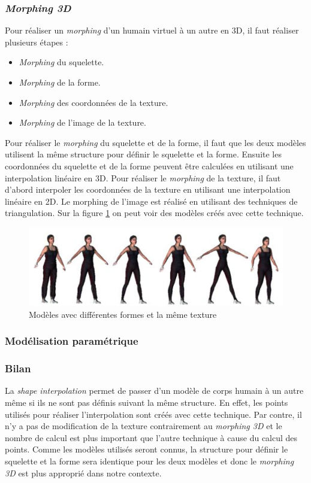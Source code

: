 \subsubsection{\emph{Morphing 3D}}
Pour réaliser un \emph{morphing} d'un humain virtuel à un autre en 3D, il faut réaliser plusieurs étapes \cite{le01} :
\begin{itemize}
\item \emph{Morphing} du squelette.
\item \emph{Morphing} de la forme.
\item \emph{Morphing} des coordonnées de la texture.
\item \emph{Morphing} de l'image de la texture.
\end{itemize}
Pour réaliser le \emph{morphing} du squelette et de la forme, il faut que les deux modèles utilisent la même structure pour définir le squelette et la forme. Ensuite les coordonnées du squelette et de la forme peuvent être calculées en utilisant une interpolation linéaire en 3D.
Pour réaliser le \emph{morphing} de la texture, il faut d'abord interpoler les coordonnées de la texture en utilisant une interpolation linéaire en 2D. Le morphing de l'image est réalisé en utilisant des techniques de triangulation. Sur la figure \ref{fig8} on peut voir des modèles créés avec cette technique.
\begin{figure}[!h]
   	\centerline{\includegraphics[scale=0.4]{images/biblio/morphing}}
   	\caption{\label{fig8} Modèles avec différentes formes et la même texture \cite{le01}}
\end{figure}
\subsubsection{Modélisation paramétrique}
\subsubsection{Bilan}
La \emph{shape interpolation} permet de passer d'un modèle de corps humain à un autre même si ils ne sont pas définis suivant la même structure. En effet, les points utilisés pour réaliser l'interpolation sont créés avec cette technique. Par contre, il n'y a pas de modification de la texture contrairement au \emph{morphing 3D} et le nombre de calcul est plus important que l'autre technique à cause du calcul des points. Comme les modèles utilisés seront connus, la structure pour définir le squelette et la forme sera identique pour les deux modèles et donc le \emph{morphing 3D} est plus approprié dans notre contexte.